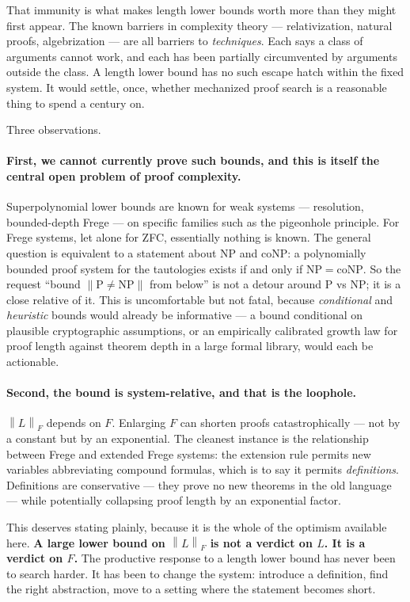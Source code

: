 \documentclass[11pt,a4paper]{article}
\newcommand{\shortest}[1]{\left\lVert #1 \right\rVert}
\begin{document}
That immunity is what makes length lower bounds worth more than they might
first appear. The known barriers in complexity theory --- relativization,
natural proofs, algebrization --- are all barriers to \emph{techniques}. Each
says a class of arguments cannot work, and each has been partially circumvented
by arguments outside the class. A length lower bound has no such escape hatch
within the fixed system. It would settle, once, whether mechanized proof
search is a reasonable thing to spend a century on.

Three observations.

\paragraph{First, we cannot currently prove such bounds, and this is itself the
central open problem of proof complexity.} Superpolynomial lower bounds are
known for weak systems --- resolution, bounded-depth Frege --- on specific
families such as the pigeonhole principle. For Frege systems, let alone for
ZFC, essentially nothing is known. The general question is equivalent to a
statement about NP and coNP: a polynomially bounded proof system for the
tautologies exists if and only if $\mathrm{NP} = \mathrm{coNP}$. So the
request ``bound $\shortest{\mathrm{P} \neq \mathrm{NP}}$ from below'' is not a
detour around P vs NP; it is a close relative of it. This is uncomfortable but
not fatal, because \emph{conditional} and \emph{heuristic} bounds would already
be informative --- a bound conditional on plausible cryptographic assumptions,
or an empirically calibrated growth law for proof length against theorem depth
in a large formal library, would each be actionable.

\paragraph{Second, the bound is system-relative, and that is the loophole.}
$\shortest{L}_F$ depends on $F$. Enlarging $F$ can shorten proofs
catastrophically --- not by a constant but by an exponential. The cleanest
instance is the relationship between Frege and extended Frege systems: the
extension rule permits new variables abbreviating compound formulas, which is
to say it permits \emph{definitions}. Definitions are conservative --- they
prove no new theorems in the old language --- while potentially collapsing
proof length by an exponential factor.

This deserves stating plainly, because it is the whole of the optimism
available here. \textbf{A large lower bound on $\shortest{L}_F$ is not a
verdict on $L$. It is a verdict on $F$.} The productive response to a length
lower bound has never been to search harder. It has been to change the system:
introduce a definition, find the right abstraction, move to a setting where the
statement becomes short.
\end{document}
